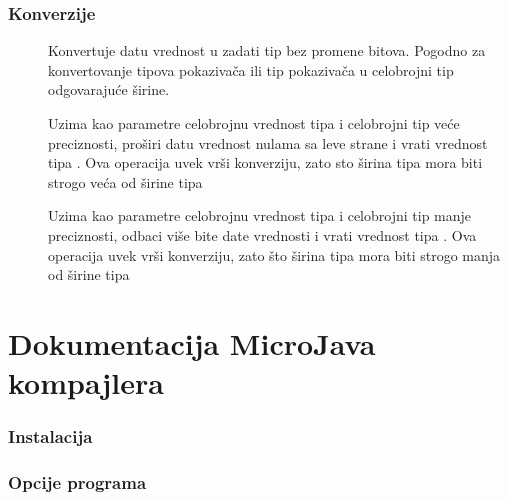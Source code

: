 \subsection*{Konverzije}

\begin{description}
\item[] Konvertuje datu vrednost u zadati tip bez promene bitova. Pogodno za konvertovanje tipova pokazivača ili tip pokazivača u celobrojni tip odgovarajuće širine.
\item[]
\item[] Uzima kao parametre celobrojnu vrednost tipa  i celobrojni tip  veće preciznosti, proširi datu vrednost nulama sa leve strane i vrati vrednost tipa . Ova operacija uvek vrši konverziju, zato sto širina tipa  mora biti strogo veća od širine tipa 
\item[] Uzima kao parametre celobrojnu vrednost tipa  i celobrojni tip  manje preciznosti, odbaci više bite date vrednosti i vrati vrednost tipa . Ova operacija uvek vrši konverziju, zato što širina tipa  mora biti strogo manja od širine tipa 
\end{description}


\chapter{Dokumentacija MicroJava kompajlera}

\subsection*{Instalacija}

\subsection*{Opcije programa}
